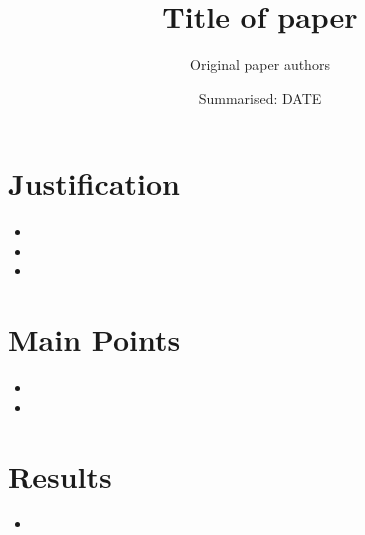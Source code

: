 \documentclass[a4paper]{article}
\title{Title of paper}
\date{Summarised: DATE}
\author{Original paper authors}
\begin{document}
\maketitle
\section{Justification}
\begin{itemize}
  \item 
  \item 
  \item 
\end{itemize}

\section{Main Points}
\begin{itemize}
  \item 
  \item 
\end{itemize}

\section{Results}
\begin{itemize}
  \item
\end{itemize}
\end{document}
